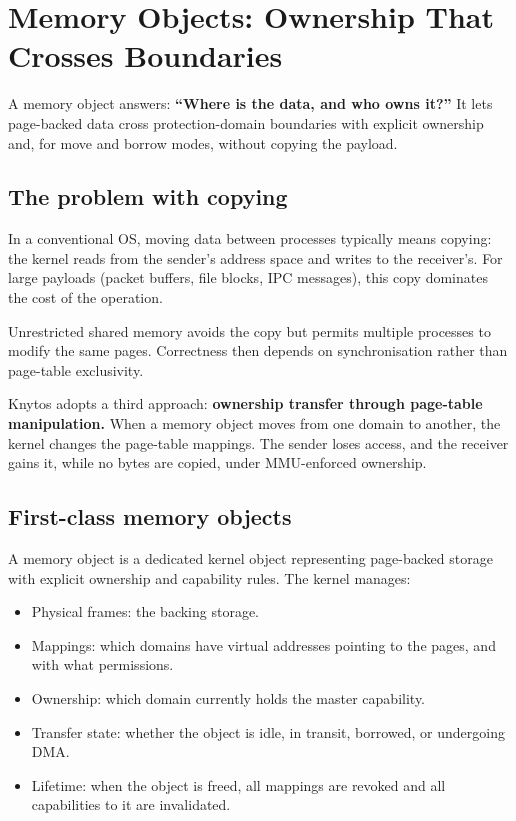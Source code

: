 \chapter{Memory Objects: Ownership That Crosses Boundaries}
\label{chap:memory-objects}

A memory object answers: \textbf{``Where is the data, and who owns it?''} It lets
page-backed data cross protection-domain boundaries with explicit ownership and,
for move and borrow modes, without copying the payload.

\section{The problem with copying}

In a conventional OS, moving data between processes typically means copying:
the kernel reads from the sender's address space and writes to the receiver's.
For large payloads (packet buffers, file blocks, IPC messages), this copy
dominates the cost of the operation.

Unrestricted shared memory avoids the copy but permits multiple processes to modify
the same pages. Correctness then depends on synchronisation rather than page-table
exclusivity.

Knytos adopts a third approach: \textbf{ownership transfer through page-table
manipulation.} When a memory object moves from one domain to another, the kernel
changes the page-table mappings. The sender loses access, and the receiver gains it,
while no bytes are copied, under MMU-enforced ownership.

\section{First-class memory objects}

A memory object is a dedicated kernel object representing page-backed storage with
explicit ownership and capability rules. The kernel manages:

\begin{itemize}
    \item Physical frames: the backing storage.
    \item Mappings: which domains have virtual addresses pointing to
        the pages, and with what permissions.
    \item Ownership: which domain currently holds the master
        capability.
    \item Transfer state: whether the object is idle, in transit,
        borrowed, or undergoing DMA.
    \item Lifetime: when the object is freed, all mappings are
        revoked and all capabilities to it are invalidated.
\end{itemize}

